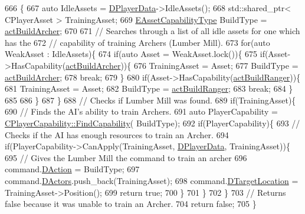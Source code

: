 \begin{DoxyCode}
666                                                          \{
667     \textcolor{keyword}{auto} IdleAssets = \hyperlink{classCAIPlayer_a83b5113c8f7e80df54940b647c5ee2e6}{DPlayerData}->IdleAssets();
668     std::shared\_ptr< CPlayerAsset > TrainingAsset;
669     \hyperlink{GameDataTypes_8h_a35b98ce26aca678b03c6f9f76e4778ce}{EAssetCapabilityType} BuildType = \hyperlink{GameDataTypes_8h_a35b98ce26aca678b03c6f9f76e4778ceae3af0123db77607fb381df7e49c5b48b}{actBuildArcher};
670 
671     \textcolor{comment}{// Searches through a list of all idle assets for one which has the }
672     \textcolor{comment}{// capability of training Archers (Lumber Mill).}
673     \textcolor{keywordflow}{for}(\textcolor{keyword}{auto} WeakAsset : IdleAssets)\{
674         \textcolor{keywordflow}{if}(\textcolor{keyword}{auto} Asset = WeakAsset.lock())\{
675             \textcolor{keywordflow}{if}(Asset->HasCapability(\hyperlink{GameDataTypes_8h_a35b98ce26aca678b03c6f9f76e4778ceae3af0123db77607fb381df7e49c5b48b}{actBuildArcher}))\{
676                 TrainingAsset = Asset;
677                 BuildType = \hyperlink{GameDataTypes_8h_a35b98ce26aca678b03c6f9f76e4778ceae3af0123db77607fb381df7e49c5b48b}{actBuildArcher};
678                 \textcolor{keywordflow}{break};
679             \}
680             \textcolor{keywordflow}{if}(Asset->HasCapability(\hyperlink{GameDataTypes_8h_a35b98ce26aca678b03c6f9f76e4778cead539d31a3eb945161800e6342a05fb11}{actBuildRanger}))\{
681                 TrainingAsset = Asset;
682                 BuildType = \hyperlink{GameDataTypes_8h_a35b98ce26aca678b03c6f9f76e4778cead539d31a3eb945161800e6342a05fb11}{actBuildRanger};
683                 \textcolor{keywordflow}{break};
684             \}
685             
686         \}
687     \}
688     \textcolor{comment}{// Checks if Lumber Mill was found.}
689     \textcolor{keywordflow}{if}(TrainingAsset)\{
690         \textcolor{comment}{// Finds the AI's ability to train Archers.}
691         \textcolor{keyword}{auto} PlayerCapability = \hyperlink{classCPlayerCapability_a881ba4b87385d7cfe5cb6ced2d26f226}{CPlayerCapability::FindCapability}(
      BuildType); 
692         \textcolor{keywordflow}{if}(PlayerCapability)\{
693             \textcolor{comment}{// Checks if the AI has enough resources to train an Archer.}
694             \textcolor{keywordflow}{if}(PlayerCapability->CanApply(TrainingAsset, \hyperlink{classCAIPlayer_a83b5113c8f7e80df54940b647c5ee2e6}{DPlayerData}, TrainingAsset))\{
695                 \textcolor{comment}{// Gives the Lumber Mill the command to train an archer}
696                 command.\hyperlink{structSPlayerCommandRequest_a80897bbccf2c4e0b148a7aa815a926c6}{DAction} = BuildType;
697                 command.\hyperlink{structSPlayerCommandRequest_aa37fc01519676345703d78b9f573894a}{DActors}.push\_back(TrainingAsset);       
698                 command.\hyperlink{structSPlayerCommandRequest_a701702b94ca2fd2738e95ef6711dd41a}{DTargetLocation} = TrainingAsset->Position();
699                 \textcolor{keywordflow}{return} \textcolor{keyword}{true};
700             \}
701         \}
702     \}
703      \textcolor{comment}{// Returns false because it was unable to train an Archer.}
704     \textcolor{keywordflow}{return} \textcolor{keyword}{false};
705 \}
\end{DoxyCode}

